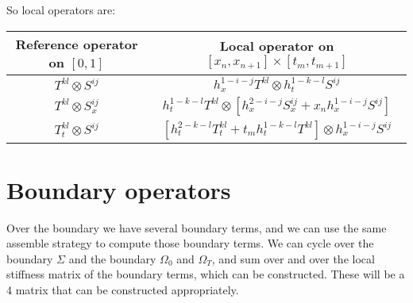 \documentclass[]{report}
\begin{document}
    So local operators are:
    \begin{center}
        \begin{tabular}[]{|c|c|}
            \hline
            Reference operator on $[0,1]$ & Local operator on $[x_n,x_{n+1}] \times [t_m, t_{m+1}]$\\
            \hline \hline
            $T^{kl} \otimes S^{ij}$ & $h_x^{1 - i - j} T^{kl} \otimes h_t^{1 - k - l}S^{ij}$ \\
            \hline
            $T^{kl} \otimes S_x^{ij}$ & $h_t^{1 - k - l} T^{kl}\otimes \left[h_x^{2 - i - j} S_x^{ij} + x_{n} h_x^{1 - i - j} S^{ij}\right]$ \\
            \hline
            $T_t^{kl} \otimes S^{ij}$ & $ \left[h_t^{2 - k - l} T_t^{kl} + t_{m} h_t^{1 - k - l} T^{kl}\right] \otimes h_x^{1 - i - j} S^{ij}$ \\
            \hline
        \end{tabular}
    \end{center}

    \section*{Boundary operators}
    Over the boundary we have several boundary terms, and we can use the same assemble strategy to compute those boundary terms. 
    We can cycle over the boundary $\Sigma$ and the boundary $\Omega_0$ and $\Omega_T$, and sum over and over the local stiffness matrix of the boundary terms, which can be constructed. These will be a 4 matrix that can be constructed appropriately.
\end{document}
